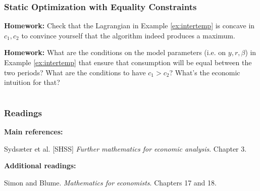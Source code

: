 \documentclass[10pt]{beamer}
\theoremstyle{definition}
\begin{document}
\begin{frame}[fragile]
\frametitle{Static Optimization with Equality Constraints}
\textbf{Homework:} Check that the Lagrangian in Example \ref{ex:intertemp} is concave in $ c_1,c_2 $ to convince yourself that the algorithm indeed produces a maximum. \bigskip

\textbf{Homework:} What are the conditions on the model parameters (i.e. on $ y,r,\beta $) in Example \ref{ex:intertemp} that ensure that consumption will be equal between the two periods? What are the conditions to have $ c_1 > c_2 $? What's the economic intuition for that?
\end{frame}

\section*{}
\begin{frame}[fragile]
\frametitle{Readings}
\textbf{Main references:}

Syds\ae{}ter et al. [SHSS] \emph{Further mathematics for economic analysis}. Chapter 3.\bigskip

\textbf{Additional readings:}

Simon and Blume. \emph{Mathematics for economists}. Chapters 17 and 18.
\end{frame}
\end{document}
